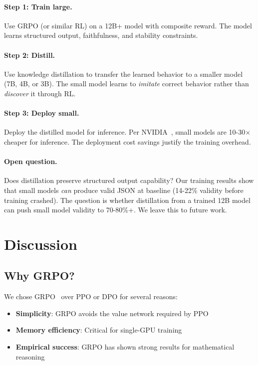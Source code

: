 \documentclass[11pt]{article}
\begin{document}
\paragraph{Step 1: Train large.}
Use GRPO (or similar RL) on a 12B+ model with composite reward.
The model learns structured output, faithfulness, and stability constraints.

\paragraph{Step 2: Distill.}
Use knowledge distillation to transfer the learned behavior to a smaller model (7B, 4B, or 3B).
The small model learns to \emph{imitate} correct behavior rather than \emph{discover} it through RL.

\paragraph{Step 3: Deploy small.}
Deploy the distilled model for inference.
Per NVIDIA~\citep{nvidia2025slm}, small models are 10-30$\times$ cheaper for inference.
The deployment cost savings justify the training overhead.

\paragraph{Open question.}
Does distillation preserve structured output capability?
Our training results show that small models \emph{can} produce valid JSON at baseline (14-22\% validity before training crashed).
The question is whether distillation from a trained 12B model can push small model validity to 70-80\%+.
We leave this to future work.

\section{Discussion}

\subsection{Why GRPO?}

We chose GRPO~\citep{shao2024grpo} over PPO or DPO for several reasons:
\begin{itemize}[leftmargin=12pt]
    \item \textbf{Simplicity}: GRPO avoids the value network required by PPO
    \item \textbf{Memory efficiency}: Critical for single-GPU training
    \item \textbf{Empirical success}: GRPO has shown strong results for mathematical reasoning~\citep{shao2024grpo}
\end{itemize}
\end{document}

